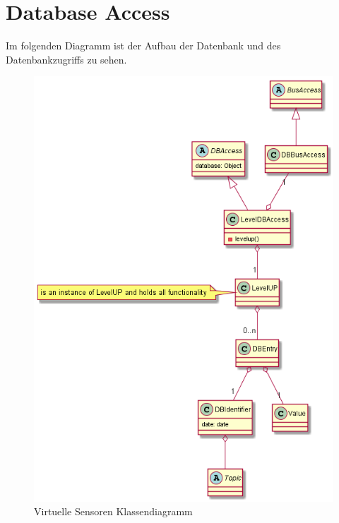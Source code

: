 \documentclass[entwurf.tex]{subfiles}
\begin{document}
  	\section{Database Access}
  		Im folgenden Diagramm ist der Aufbau der Datenbank und des Datenbankzugriffs zu sehen.
  		\begin{figure}[H]
  			\begin{center}
 				\includegraphics{diagrams/DBAccess.png}
  				\caption{Virtuelle Sensoren Klassendiagramm}
  			\end{center}
  		\end{figure}
  	
  	
  	
  	\newpage
\end{document}
